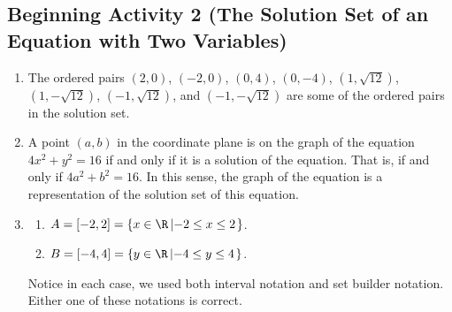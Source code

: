 \documentclass[11pt]{article}
\begin{document}
\subsection*{Beginning Activity 2 (The Solution Set of an Equation with Two Variables)}
\begin{enumerate}
\item The ordered pairs  $\left( {2, 0} \right)$, $\left( { -2, 0} \right)$, 
$\left( {0, 4} \right)$, $\left( {0,  -4} \right)$, $\left( {1, \sqrt{12}} \right)$, 
$\left( {1, -\sqrt{12}} \right)$, $\left( {-1, \sqrt{12}} \right)$, and 
$\left( {-1, -\sqrt{12}} \right)$ are some of the ordered pairs in the solution set.

\item A point $(a, b)$ in the coordinate plane is on the graph of the equation 
$4x^2 + y^2 = 16$ if and only if it is a solution of the equation.  That is, if and only if  $4a^2 + b^2 = 16$.  In this sense, the graph of the equation is a representation of the solution set of this equation.

\item \begin{multicols}{2}
\begin{enumerate}
\item $A = \left[ -2, 2 \right] = \left\{ x \in \R \left| -2 \leq x \leq 2 \right. \right\}$.
\item $B = \left[ -4, 4 \right] = \left\{ y \in \R \left| -4 \leq y \leq 4 \right. \right\}$.
\end{enumerate}
Notice in each case, we used both interval notation and set builder notation.  Either one of these notations is correct.
\end{multicols}
\end{enumerate}
\hbreak



%
%
%
\end{document}
